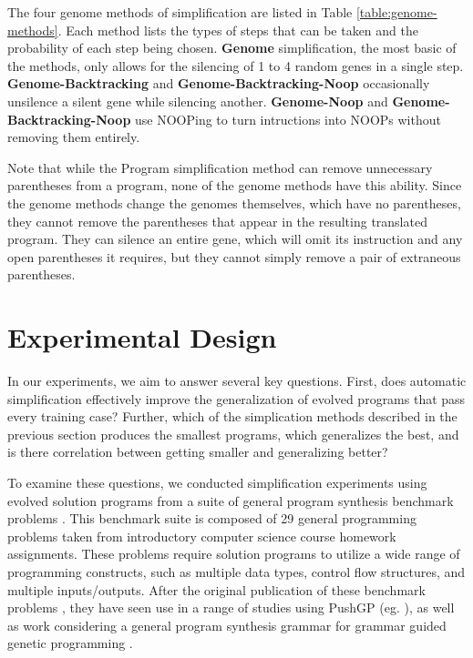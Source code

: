 The four genome methods of simplification are listed in Table \ref{table:genome-methods}. Each method lists the types of steps that can be taken and the probability of each step being chosen. \textbf{Genome} simplification, the most basic of the methods, only allows for the silencing 
of 1 to 4 random genes in a single step. \textbf{Genome-Backtracking} and \textbf{Genome-Backtracking-Noop} occasionally unsilence a silent gene while silencing another. \textbf{Genome-Noop} and \textbf{Genome-Backtracking-Noop} use NOOPing to turn intructions into NOOPs without removing them entirely.

Note that while the Program simplification method can remove unnecessary parentheses from a program, none of the genome methods have this ability. Since the genome methods change the genomes themselves, which have no parentheses, they cannot remove the parentheses that appear in the resulting translated program. They can silence an entire gene, which will omit its instruction and any open parentheses it requires, but they cannot simply remove a pair of extraneous parentheses.

\section{Experimental Design}
\label{sec:setup}

In our experiments, we aim to answer several key questions. 
First, does automatic simplification effectively improve the generalization of evolved programs that pass every training case? 
Further, which of the simplication methods described in the previous section 
produces the smallest programs, which generalizes the best, and is there correlation between getting smaller and generalizing better?

To examine these questions, we conducted simplification experiments using evolved solution programs from a suite of general program synthesis benchmark problems \cite{Helmuth:2015:GECCO}. This benchmark suite is composed of 29 general programming problems taken from introductory computer science course homework assignments. These problems require solution programs to utilize a wide range of programming constructs, such as multiple data types, control flow structures, and multiple inputs/outputs.
After the original publication of these benchmark problems \cite{Helmuth:2015:GECCO}, they have seen use in a range of studies using PushGP (eg. \cite{Helmuth:2016:GECCO, McPhee:2016:GPTP, Helmuth:2015:GPTP, Helmuth:2015:dissertation}),  %
as well as work considering a general program synthesis grammar for 
grammar guided genetic programming \cite{Forstenlechner:2017:eurogp}.


